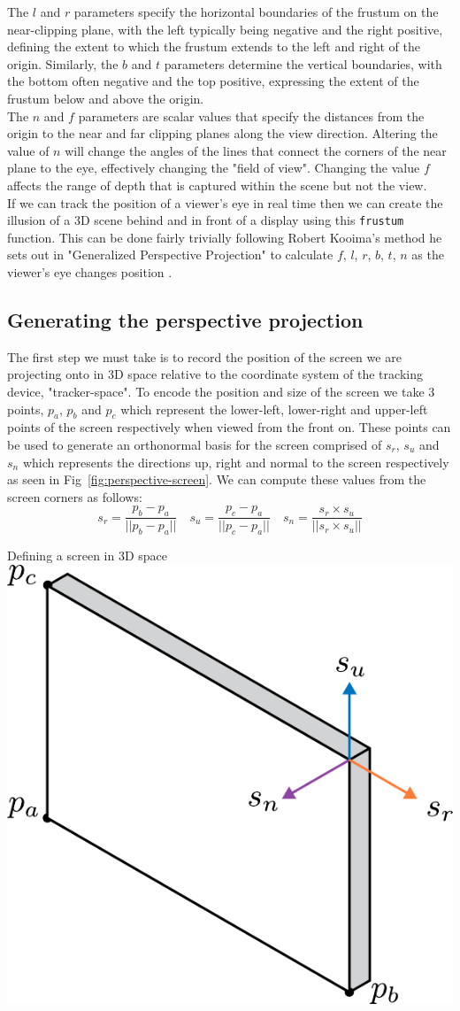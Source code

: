 The $l$ and $r$ parameters specify the horizontal boundaries of the frustum on the near-clipping plane, with the left typically being negative and the right positive, defining the extent to which the frustum extends to the left and right of the origin. Similarly, the $b$ and $t$ parameters determine the vertical boundaries, with the bottom often negative and the top positive, expressing the extent of the frustum below and above the origin. \\

The $n$ and $f$ parameters are scalar values that specify the distances from the origin to the near and far clipping planes along the view direction. Altering the value of $n$ will change the angles of the lines that connect the corners of the near plane to the eye, effectively changing the "field of view". Changing the value $f$ affects the range of depth that is captured within the scene but not the view. \\

If we can track the position of a viewer's eye in real time then we can create the illusion of a 3D scene behind and in front of a display using this \texttt{frustum} function. This can be done fairly trivially following Robert Kooima's method he sets out in "Generalized Perspective Projection" to calculate $f$, $l$, $r$, $b$, $t$, $n$ as the viewer's eye changes position \cite{kooima2009generalized}. 

\subsection{Generating the perspective projection}

The first step we must take is to record the position of the screen we are projecting onto in 3D space relative to the coordinate system of the tracking device, "tracker-space". To encode the position and size of the screen we take 3 points, $p_a$, $p_b$ and $p_c$ which represent the lower-left, lower-right and upper-left points of the screen respectively when viewed from the front on. These points can be used to generate an orthonormal basis for the screen comprised of $s_r$, $s_u$ and $s_n$ which represents the directions up, right and normal to the screen respectively as seen in Fig~\ref{fig:perspective-screen}. We can compute these values from the screen corners as follows:
\[s_r = \frac{p_b-p_a}{||p_b-p_a||} \quad s_u = \frac{p_c-p_a}{||p_c-p_a||} \quad s_n = \frac{s_r\times s_u}{||s_r \times s_u||}\]

\begin{figureBox}[label={fig:perspective-screen}, width=0.75\linewidth]{Defining a screen in 3D space}
    \includegraphics[width = 0.3\linewidth]{./background/figures/projection/screen.pdf}
\end{figureBox}

